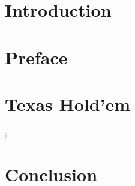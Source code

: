 







\section*{Introduction}



\section*{Preface}

\newpage

\tableofcontents

\listoffigures



\section*{Texas Hold'em}




;


\section{Conclusion}

